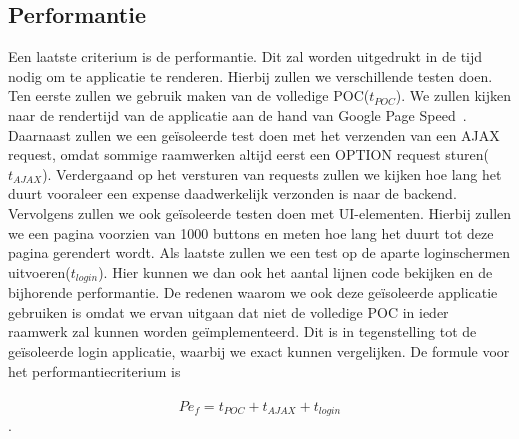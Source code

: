 \subsection{Performantie}
\label{sec:vergelijking-gemeenschap}
Een laatste criterium is de performantie. 
Dit zal worden uitgedrukt in de tijd nodig om te applicatie te renderen. 
Hierbij zullen we verschillende testen doen. 
Ten eerste zullen we gebruik maken van de volledige POC($t_{POC}$). 
We zullen kijken naar de rendertijd van de applicatie aan de hand van Google Page Speed~\cite{Morgan2011}. 
Daarnaast zullen we een geïsoleerde test doen met het verzenden van een AJAX request, omdat sommige raamwerken altijd eerst een OPTION request sturen($t_{AJAX}$). Verdergaand op het versturen van requests zullen we kijken hoe lang het duurt vooraleer een expense daadwerkelijk verzonden is naar de backend. Vervolgens zullen we ook geïsoleerde testen doen met UI-elementen. 
Hierbij zullen we een pagina voorzien van 1000 buttons en meten hoe lang het duurt tot deze pagina gerendert wordt. 
Als laatste zullen we een test op de aparte loginschermen uitvoeren($t_{login}$). 
Hier kunnen we dan ook het aantal lijnen code bekijken en de bijhorende performantie. 
De redenen waarom we ook deze geïsoleerde applicatie gebruiken is omdat we ervan uitgaan dat niet de volledige POC in ieder raamwerk zal kunnen worden geïmplementeerd. 
Dit is in tegenstelling tot de geïsoleerde login applicatie, waarbij we exact kunnen vergelijken.
De formule voor het performantiecriterium is 
\paragraph{}
\begin{equation}
  Pe_f=t_{POC}+t_{AJAX}+t_{login} 
  \label{eq:performantie}
\end{equation}.
